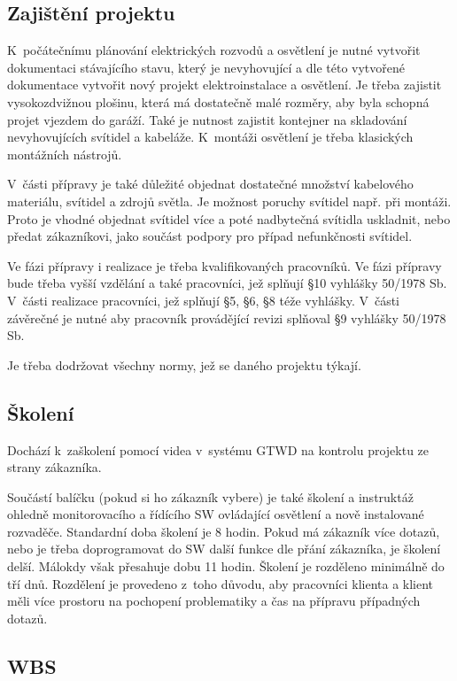 \documentclass[a4paper, twoside, 11pt]{article}
\begin{document}
	\subsection{Zajištění projektu}
		K~počátečnímu plánování elektrických rozvodů a osvětlení je nutné vytvořit dokumentaci stávajícího stavu, který je nevyhovující a dle této vytvořené dokumentace vytvořit nový projekt elektroinstalace a osvětlení.
		Je třeba zajistit vysokozdvižnou plošinu, která má dostatečně malé rozměry, aby byla schopná projet vjezdem do garáží. Také je nutnost zajistit kontejner na skladování nevyhovujících svítidel a kabeláže. K~montáži osvětlení je třeba klasických montážních nástrojů.\par
		V~části přípravy je také důležité objednat dostatečné množství kabelového materiálu, svítidel a zdrojů světla. Je možnost poruchy svítidel např. při montáži. Proto je vhodné objednat svítidel více a poté nadbytečná svítidla uskladnit, nebo předat zákazníkovi, jako součást podpory pro případ nefunkčnosti svítidel.\par
		Ve fázi přípravy i realizace je třeba kvalifikovaných pracovníků. Ve fázi přípravy bude třeba vyšší vzdělání a také pracovníci, jež splňují \S 10 vyhlášky 50/1978 Sb. V~části realizace pracovníci, jež splňují \S 5, \S 6, \S 8 téže vyhlášky. V~části závěrečné je nutné aby pracovník provádějící revizi splňoval \S 9 vyhlášky 50/1978 Sb.\par
		Je třeba dodržovat všechny normy, jež se daného projektu týkají.\par
		
	\subsection{Školení}
		Dochází k~zaškolení pomocí videa v~systému GTWD na kontrolu projektu ze strany zákazníka.\par
		Součástí balíčku (pokud si ho zákazník vybere) je také školení a instruktáž ohledně monitorovacího a řídícího SW ovládající osvětlení a nově instalované rozvaděče. Standardní doba školení je 8 hodin. Pokud má zákazník více dotazů, nebo je třeba doprogramovat do SW další funkce dle přání zákazníka, je školení delší. Málokdy však přesahuje dobu 11 hodin. Školení je rozděleno minimálně do tří dnů. Rozdělení je provedeno z~toho důvodu, aby pracovníci klienta a klient měli více prostoru na pochopení problematiky a čas na přípravu případných dotazů.
	\subsection{WBS}
	
\end{document}
